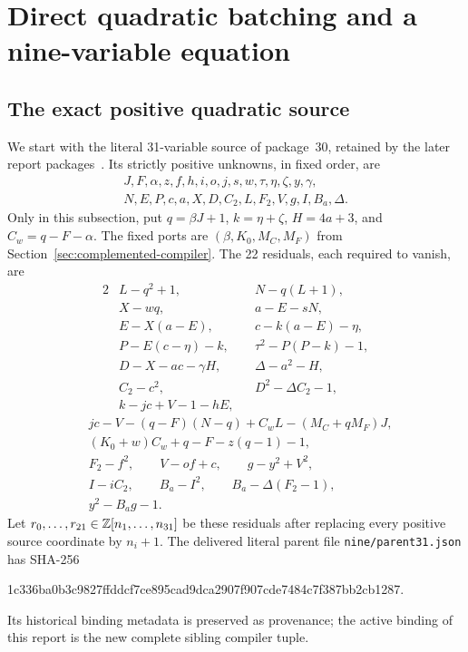 \section{Direct quadratic batching and a nine-variable equation}
\label{sec:nine}

\subsection{The exact positive quadratic source}

We start with the literal 31-variable source of package~30, retained
by the later report packages~\cite{repo}. Its strictly positive unknowns,
in fixed order, are
\[
\begin{gathered}
 J,F,\alpha,z,f,h,i,o,j,s,w,\tau,\eta,\zeta,y,\gamma,\\
 N,E,P,c,a,X,D,C_2,L,F_2,V,g,I,B_a,\Delta.
\end{gathered}
\]
Only in this subsection, put $q=\beta J+1$, $k=\eta+\zeta$,
$H=4a+3$, and $C_w=q-F-\alpha$. The fixed ports are
$(\beta,K_0,M_C,M_F)$ from Section~\ref{sec:complemented-compiler}.
The 22 residuals, each required to vanish, are
\begin{alignat}{2}
 &L-q^2+1, &&N-q(L+1),\nonumber\\
 &X-wq, &&a-E-sN,\nonumber\\
 &E-X(a-E), &&c-k(a-E)-\eta,\nonumber\\
 &P-E(c-\eta)-k, &&\tau^2-P(P-k)-1,\nonumber\\
 &D-X-ac-\gamma H, &&\Delta-a^2-H,\nonumber\\
 &C_2-c^2, &&D^2-\Delta C_2-1,\nonumber\\
 &k-jc+V-1-hE, &&\label{eq:parent22}
\end{alignat}
\vspace{-6mm}
\begin{align*}
 &jc-V-(q-F)(N-q)+C_wL-(M_C+qM_F)J,\\
 &(K_0+w)C_w+q-F-z(q-1)-1,\\
 &F_2-f^2,\qquad V-of+c,\qquad g-y^2+V^2,\\
 &I-iC_2,\qquad B_a-I^2,\qquad B_a-\Delta(F_2-1),\\
 &y^2-B_ag-1.
\end{align*}
Let $r_0,\ldots,r_{21}\in\mathbb Z[n_1,\ldots,n_{31}]$ be these residuals
after replacing every positive source coordinate by $n_i+1$.
The delivered literal parent file \texttt{nine/parent31.json} has SHA-256
\begin{center}\footnotesize\ttfamily
1c336ba0b3c9827ffddcf7ce895cad9dca2907f907cde7484c7f387bb2cb1287.
\end{center}
Its historical binding metadata is preserved as provenance; the active
binding of this report is the new complete sibling compiler tuple.

